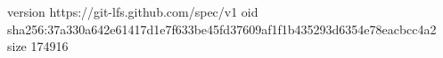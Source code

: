 version https://git-lfs.github.com/spec/v1
oid sha256:37a330a642e61417d1e7f633be45fd37609af1f1b435293d6354e78eacbcc4a2
size 174916
